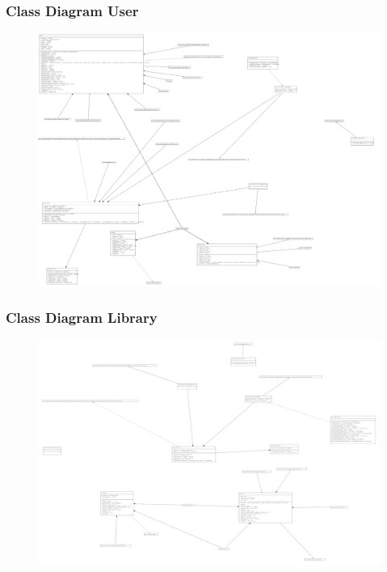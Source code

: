\documentclass{article}
\begin{document}
		\subsubsection{Class Diagram User}
		\begin{figure}[H]
			\centering
			\includegraphics[width=1.0\textwidth]{Immagini/classdiagramdesignuser}
		\end{figure}
		\subsubsection{Class Diagram Library}
		\begin{figure}[H]
			\centering
			\includegraphics[width=1.0\textwidth]{Immagini/classdiagramlibrary}
		\end{figure}
\end{document}
